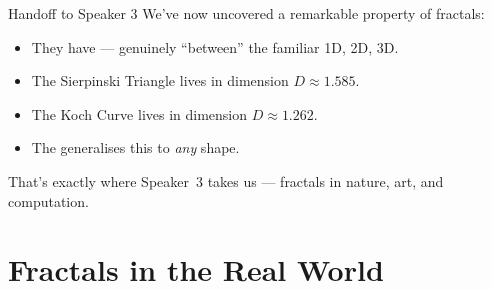 \begin{frame}{Handoff to Speaker 3}
  \small
  We've now uncovered a remarkable property of fractals:

  \begin{itemize}
    \item They have  ---
      genuinely ``between'' the familiar 1D, 2D, 3D.
    \item The Sierpinski Triangle lives in dimension
      $D\approx 1.585$.
    \item The Koch Curve lives in dimension
      $D\approx 1.262$.
    \item The  generalises
      this to \emph{any} shape.
  \end{itemize}

  \pause
  \vspace{0.3cm}
  \begin{center}
  \end{center}

  \vspace{0.2cm}
  \pause
  That's exactly where Speaker~3 takes us ---
  fractals in nature, art, and computation.
\end{frame}

\section{Fractals in the Real World}

